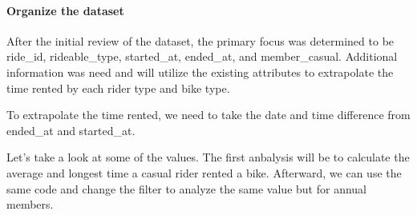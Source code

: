 \documentclass[
]{article}
\newenvironment{Shaded}{\begin{snugshade}}{\end{snugshade}}
\newcommand{\AttributeTok}[1]{\textcolor[rgb]{0.77,0.63,0.00}{#1}}
\newcommand{\CommentTok}[1]{\textcolor[rgb]{0.56,0.35,0.01}{\textit{#1}}}
\newcommand{\FunctionTok}[1]{\textcolor[rgb]{0.00,0.00,0.00}{#1}}
\newcommand{\NormalTok}[1]{#1}
\newcommand{\OtherTok}[1]{\textcolor[rgb]{0.56,0.35,0.01}{#1}}
\newcommand{\SpecialCharTok}[1]{\textcolor[rgb]{0.00,0.00,0.00}{#1}}
\newcommand{\StringTok}[1]{\textcolor[rgb]{0.31,0.60,0.02}{#1}}
\begin{document}
\hypertarget{organize-the-dataset}{%
\paragraph{Organize the dataset}\label{organize-the-dataset}}

After the initial review of the dataset, the primary focus was
determined to be ride\_id, rideable\_type, started\_at, ended\_at, and
member\_casual. Additional information was need and will utilize the
existing attributes to extrapolate the time rented by each rider type
and bike type.

To extrapolate the time rented, we need to take the date and time
difference from ended\_at and started\_at.

\begin{Shaded}
\end{Shaded}

Let's take a look at some of the values. The first anbalysis will be to
calculate the average and longest time a casual rider rented a bike.
Afterward, we can use the same code and change the filter to analyze the
same value but for annual members.
\end{document}
